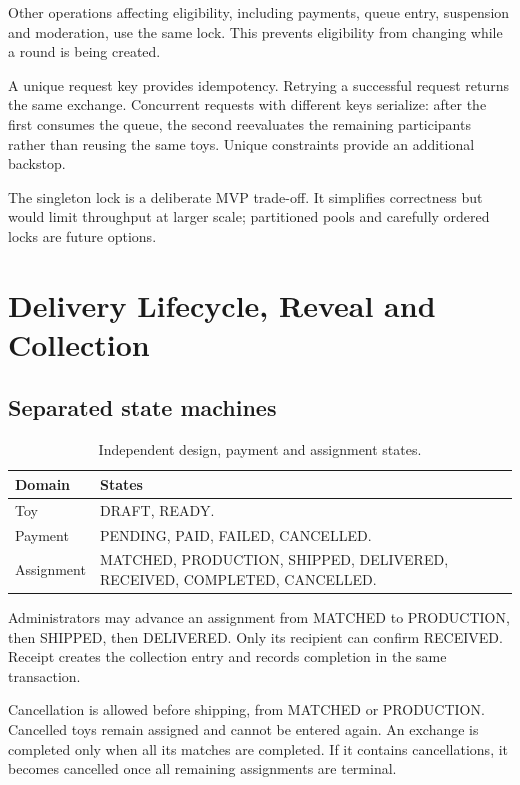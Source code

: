 \documentclass[11pt,a4paper]{article}
\begin{document}
Other operations affecting eligibility, including payments, queue entry, suspension and moderation, use the same lock. This prevents eligibility from changing while a round is being created.

A unique request key provides idempotency. Retrying a successful request returns the same exchange. Concurrent requests with different keys serialize: after the first consumes the queue, the second reevaluates the remaining participants rather than reusing the same toys. Unique constraints provide an additional backstop.

The singleton lock is a deliberate MVP trade-off. It simplifies correctness but would limit throughput at larger scale; partitioned pools and carefully ordered locks are future options.

\section{Delivery Lifecycle, Reveal and Collection}

\subsection{Separated state machines}
\begin{table}[htbp]
\centering\small
\begin{tabularx}{\textwidth}{p{3cm}Y}
\toprule\textbf{Domain} & \textbf{States}\\
\midrule
Toy & DRAFT, READY.\\
Payment & PENDING, PAID, FAILED, CANCELLED.\\
Assignment & MATCHED, PRODUCTION, SHIPPED, DELIVERED, RECEIVED, COMPLETED, CANCELLED.\\
\bottomrule
\end{tabularx}
\caption{Independent design, payment and assignment states.}
\end{table}

Administrators may advance an assignment from MATCHED to PRODUCTION, then SHIPPED, then DELIVERED. Only its recipient can confirm RECEIVED. Receipt creates the collection entry and records completion in the same transaction.

Cancellation is allowed before shipping, from MATCHED or PRODUCTION. Cancelled toys remain assigned and cannot be entered again. An exchange is completed only when all its matches are completed. If it contains cancellations, it becomes cancelled once all remaining assignments are terminal.
\end{document}
